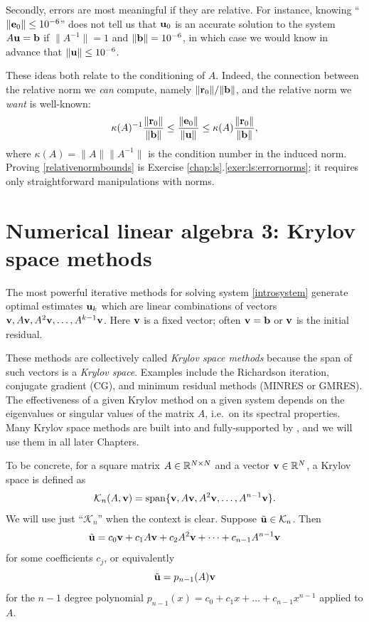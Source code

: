 Secondly, errors are most meaningful if they are relative.  For instance, knowing ``$\|\mathbf{e}_0\|\le 10^{-6}$'' does not tell us that $\mathbf{u}_0$ is an accurate solution to the system $A \mathbf{u} = \mathbf{b}$ if $\|A^{-1}\|=1$ and $\|\mathbf{b}\|= 10^{-6}$, in which case we would know in advance that $\|\mathbf{u}\|\le 10^{-6}$.

These ideas both relate to the conditioning of $A$.  Indeed, the connection between the relative norm we \emph{can} compute, namely $\|\mathbf{r}_0\|/\|\mathbf{b}\|$, and the relative norm we \emph{want} is well-known:
\begin{equation}
\kappa(A)^{-1} \frac{\|\mathbf{r}_0\|}{\|\mathbf{b}\|} \le \frac{\|\mathbf{e}_0\|}{\|\mathbf{u}\|} \le \kappa(A) \frac{\|\mathbf{r}_0\|}{\|\mathbf{b}\|}, \label{relativenormbounds}
\end{equation}
where $\kappa(A) = \|A\| \|A^{-1}\|$ is the condition number in the induced norm.  Proving \eqref{relativenormbounds} is Exercise \ref{chap:ls}.\ref{exer:ls:errornorms}; it requires only straightforward manipulations with norms.


\section{Numerical linear algebra 3: Krylov space methods}

The most powerful iterative methods for solving system \eqref{introsystem} generate optimal estimates $\mathbf{u}_k$ which are linear combinations of vectors $\mathbf{v},A\mathbf{v},A^2\mathbf{v},\dots,A^{k-1}\mathbf{v}$.  Here $\mathbf{v}$ is a fixed vector; often $\mathbf{v}=\mathbf{b}$ or $\mathbf{v}$ is the initial residual.

These methods are collectively called \emph{Krylov space methods} because the span of such vectors is a \emph{Krylov space}.  Examples include the Richardson iteration, conjugate gradient (CG), and minimum residual methods (MINRES or GMRES).  The effectiveness of a given Krylov method on a given system depends on the eigenvalues or singular values of the matrix $A$, i.e.~on its spectral properties.  Many Krylov space methods are built into and fully-supported by \PETSc, and we will use them in all later Chapters.

To be concrete, for a square matrix $A\in \mathbb{R}^{N\times N}$ and a vector $\mathbf{v}\in\mathbb{R}^N$, a Krylov space is defined as
\begin{equation}
    \mathcal{K}_n(A,\mathbf{v}) = \operatorname{span}\{\mathbf{v},A\mathbf{v},A^2\mathbf{v},\dots,A^{n-1}\mathbf{v}\}. \label{eq:ls:krylovdefn}
\end{equation}
We will use just ``$\mathcal{K}_n$'' when the context is clear.  Suppose $\tilde{\mathbf{u}} \in \mathcal{K}_n$.  Then
    $$\tilde{\mathbf{u}} = c_0 \mathbf{v} + c_1 A \mathbf{v} + c_2 A^2 \mathbf{v} + \dots + c_{n-1} A^{n-1} \mathbf{v}$$
for some coefficients $c_j$, or equivalently
    $$\tilde{\mathbf{u}} = p_{n-1}(A) \mathbf{v}$$
for the $n-1$ degree polynomial $p_{n-1}(x) = c_0 + c_1 x + \dots + c_{n-1} x^{n-1}$ applied to $A$.

